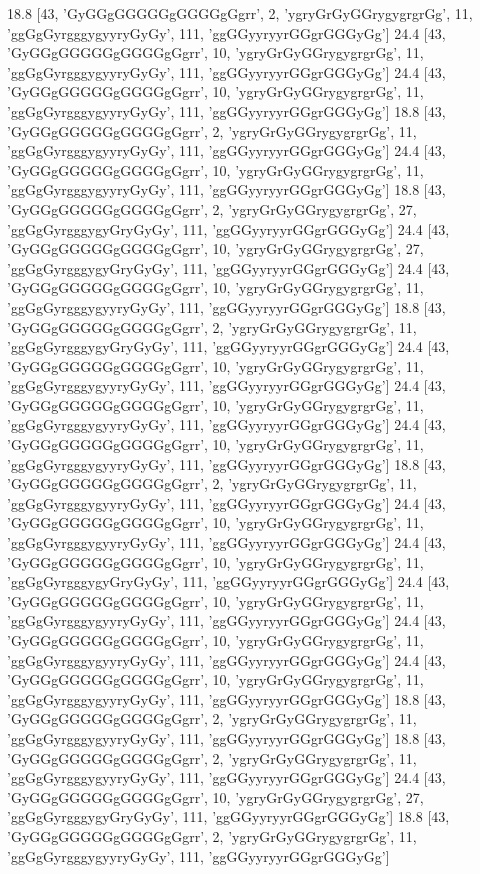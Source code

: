 18.8 [43, 'GyGGgGGGGGgGGGGgGgrr', 2, 'ygryGrGyGGrygygrgrGg', 11, 'ggGgGyrgggygyyryGyGy', 111, 'ggGGyyryyrGGgrGGGyGg']
24.4 [43, 'GyGGgGGGGGgGGGGgGgrr', 10, 'ygryGrGyGGrygygrgrGg', 11, 'ggGgGyrgggygyyryGyGy', 111, 'ggGGyyryyrGGgrGGGyGg']
24.4 [43, 'GyGGgGGGGGgGGGGgGgrr', 10, 'ygryGrGyGGrygygrgrGg', 11, 'ggGgGyrgggygyyryGyGy', 111, 'ggGGyyryyrGGgrGGGyGg']
18.8 [43, 'GyGGgGGGGGgGGGGgGgrr', 2, 'ygryGrGyGGrygygrgrGg', 11, 'ggGgGyrgggygyyryGyGy', 111, 'ggGGyyryyrGGgrGGGyGg']
24.4 [43, 'GyGGgGGGGGgGGGGgGgrr', 10, 'ygryGrGyGGrygygrgrGg', 11, 'ggGgGyrgggygyyryGyGy', 111, 'ggGGyyryyrGGgrGGGyGg']
18.8 [43, 'GyGGgGGGGGgGGGGgGgrr', 2, 'ygryGrGyGGrygygrgrGg', 27, 'ggGgGyrgggygyGryGyGy', 111, 'ggGGyyryyrGGgrGGGyGg']
24.4 [43, 'GyGGgGGGGGgGGGGgGgrr', 10, 'ygryGrGyGGrygygrgrGg', 27, 'ggGgGyrgggygyGryGyGy', 111, 'ggGGyyryyrGGgrGGGyGg']
24.4 [43, 'GyGGgGGGGGgGGGGgGgrr', 10, 'ygryGrGyGGrygygrgrGg', 11, 'ggGgGyrgggygyyryGyGy', 111, 'ggGGyyryyrGGgrGGGyGg']
18.8 [43, 'GyGGgGGGGGgGGGGgGgrr', 2, 'ygryGrGyGGrygygrgrGg', 11, 'ggGgGyrgggygyGryGyGy', 111, 'ggGGyyryyrGGgrGGGyGg']
24.4 [43, 'GyGGgGGGGGgGGGGgGgrr', 10, 'ygryGrGyGGrygygrgrGg', 11, 'ggGgGyrgggygyyryGyGy', 111, 'ggGGyyryyrGGgrGGGyGg']
24.4 [43, 'GyGGgGGGGGgGGGGgGgrr', 10, 'ygryGrGyGGrygygrgrGg', 11, 'ggGgGyrgggygyyryGyGy', 111, 'ggGGyyryyrGGgrGGGyGg']
24.4 [43, 'GyGGgGGGGGgGGGGgGgrr', 10, 'ygryGrGyGGrygygrgrGg', 11, 'ggGgGyrgggygyyryGyGy', 111, 'ggGGyyryyrGGgrGGGyGg']
18.8 [43, 'GyGGgGGGGGgGGGGgGgrr', 2, 'ygryGrGyGGrygygrgrGg', 11, 'ggGgGyrgggygyyryGyGy', 111, 'ggGGyyryyrGGgrGGGyGg']
24.4 [43, 'GyGGgGGGGGgGGGGgGgrr', 10, 'ygryGrGyGGrygygrgrGg', 11, 'ggGgGyrgggygyyryGyGy', 111, 'ggGGyyryyrGGgrGGGyGg']
24.4 [43, 'GyGGgGGGGGgGGGGgGgrr', 10, 'ygryGrGyGGrygygrgrGg', 11, 'ggGgGyrgggygyGryGyGy', 111, 'ggGGyyryyrGGgrGGGyGg']
24.4 [43, 'GyGGgGGGGGgGGGGgGgrr', 10, 'ygryGrGyGGrygygrgrGg', 11, 'ggGgGyrgggygyyryGyGy', 111, 'ggGGyyryyrGGgrGGGyGg']
24.4 [43, 'GyGGgGGGGGgGGGGgGgrr', 10, 'ygryGrGyGGrygygrgrGg', 11, 'ggGgGyrgggygyyryGyGy', 111, 'ggGGyyryyrGGgrGGGyGg']
24.4 [43, 'GyGGgGGGGGgGGGGgGgrr', 10, 'ygryGrGyGGrygygrgrGg', 11, 'ggGgGyrgggygyyryGyGy', 111, 'ggGGyyryyrGGgrGGGyGg']
18.8 [43, 'GyGGgGGGGGgGGGGgGgrr', 2, 'ygryGrGyGGrygygrgrGg', 11, 'ggGgGyrgggygyyryGyGy', 111, 'ggGGyyryyrGGgrGGGyGg']
18.8 [43, 'GyGGgGGGGGgGGGGgGgrr', 2, 'ygryGrGyGGrygygrgrGg', 11, 'ggGgGyrgggygyyryGyGy', 111, 'ggGGyyryyrGGgrGGGyGg']
24.4 [43, 'GyGGgGGGGGgGGGGgGgrr', 10, 'ygryGrGyGGrygygrgrGg', 27, 'ggGgGyrgggygyGryGyGy', 111, 'ggGGyyryyrGGgrGGGyGg']
18.8 [43, 'GyGGgGGGGGgGGGGgGgrr', 2, 'ygryGrGyGGrygygrgrGg', 11, 'ggGgGyrgggygyyryGyGy', 111, 'ggGGyyryyrGGgrGGGyGg']
